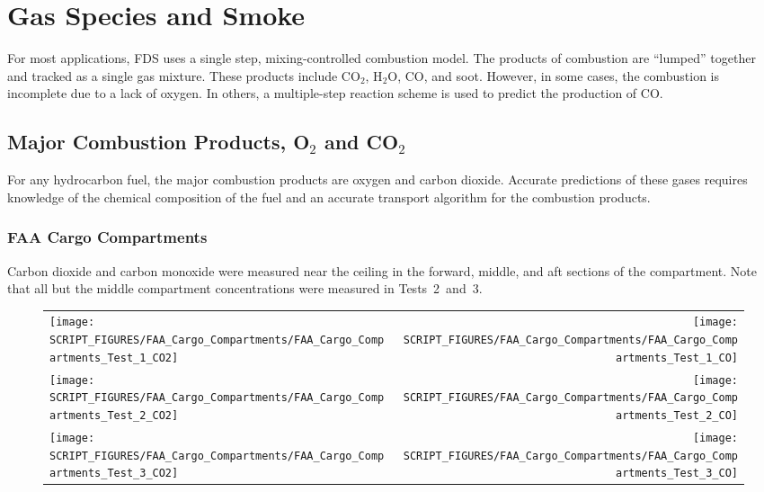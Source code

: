 
\chapter{Gas Species and Smoke}

For most applications, FDS uses a single step, mixing-controlled combustion model. The products of combustion are ``lumped'' together and tracked as a single gas mixture. These products include CO$_2$, H$_2$O, CO, and soot. However, in some cases, the combustion is incomplete due to a lack of oxygen. In others, a multiple-step reaction scheme is used to predict the production of CO.

\section{Major Combustion Products, O$_2$ and CO$_2$}

For any hydrocarbon fuel, the major combustion products are oxygen and carbon dioxide. Accurate predictions of these gases requires knowledge of the chemical composition of the fuel and an accurate transport algorithm for the combustion products.

\clearpage

\subsection{FAA Cargo Compartments}

Carbon dioxide and carbon monoxide were measured near the ceiling in the forward, middle, and aft sections of the compartment. Note that all but the middle compartment concentrations were measured in Tests~2~and~3.


\begin{figure}[h]
\begin{tabular*}{\textwidth}{l@{\extracolsep{\fill}}r}
\texttt{[image: SCRIPT\_FIGURES/FAA\_Cargo\_Compartments/FAA\_Cargo\_Compartments\_Test\_1\_CO2]} &
\texttt{[image: SCRIPT\_FIGURES/FAA\_Cargo\_Compartments/FAA\_Cargo\_Compartments\_Test\_1\_CO]} \\
\texttt{[image: SCRIPT\_FIGURES/FAA\_Cargo\_Compartments/FAA\_Cargo\_Compartments\_Test\_2\_CO2]} &
\texttt{[image: SCRIPT\_FIGURES/FAA\_Cargo\_Compartments/FAA\_Cargo\_Compartments\_Test\_2\_CO]} \\
\texttt{[image: SCRIPT\_FIGURES/FAA\_Cargo\_Compartments/FAA\_Cargo\_Compartments\_Test\_3\_CO2]} &
\texttt{[image: SCRIPT\_FIGURES/FAA\_Cargo\_Compartments/FAA\_Cargo\_Compartments\_Test\_3\_CO]}
\end{tabular*}
\label{FAA_Cargo_CO2_CO}
\end{figure}

